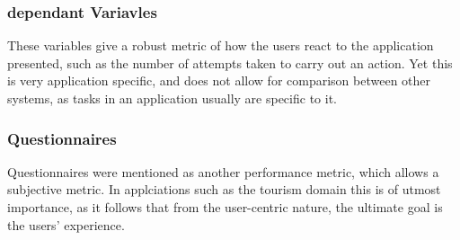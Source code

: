 \subsubsection{dependant Variavles}
These variables give a robust metric of how the users react to the 
application presented, such as the number of attempts taken to carry out an action.
Yet this is very application specific, and does not allow for comparison between other systems, as 
tasks in an application usually are specific to it.
\\

\subsubsection{Questionnaires}
Questionnaires were mentioned as another performance metric, which allows a subjective metric. 
In applciations such as the tourism domain this is of utmost importance, as it follows that 
from the user-centric nature, the ultimate goal is the users' experience.  
